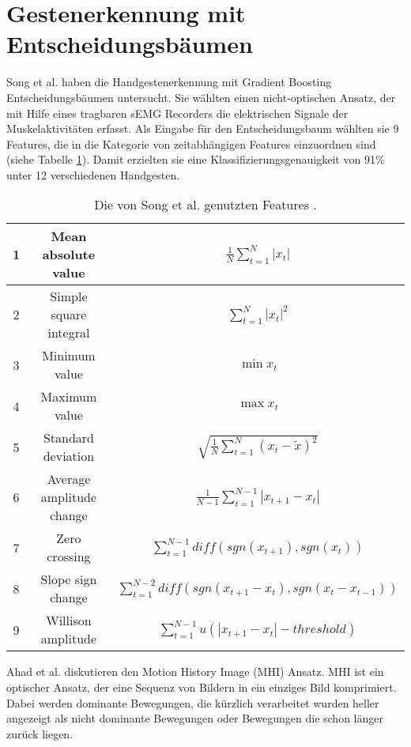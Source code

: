 \section{Gestenerkennung mit Entscheidungsbäumen}
\label{sec:sota_misc}
Song et al. \cite{song2019design} haben die Handgestenerkennung mit Gradient Boosting Entscheidungsbäumen untersucht. Sie wählten einen nicht-optischen Ansatz, der mit Hilfe eines tragbaren sEMG Recorders
die elektrischen Signale der Muskelaktivitäten erfasst. Als Eingabe für den Entscheidungsbaum wählten sie 9 Features, die in die Kategorie von zeitabhängigen Features einzuordnen sind
(siehe Tabelle \ref{tab:songFeatures}). Damit erzielten sie eine Klassifizierungsgenauigkeit von 91\% unter 12 verschiedenen Handgesten.
\begin{table}[h!]
    \centering
    \begin{tabular}{ c | c | c }
        \hline
        \hline
        1 & Mean absolute value & $\frac{1}{N}\sum^N_{t=1} |x_t|$ \\\hline
        2 & Simple square integral & $\sum^N_{t=1} |x_t|^2$ \\\hline
        3 & Minimum value & $\min x_t$ \\\hline
        4 & Maximum value & $\max x_t$ \\\hline
        5 & Standard deviation & $\sqrt{\frac{1}{N}\sum^N_{t=1}(x_t - \tilde{x})^2}$ \\\hline
        6 & Average amplitude change & $\frac{1}{N-1}\sum^{N-1}_{t=1} |x_{t + 1} - x_t|$ \\\hline
        7 & Zero crossing & $\sum^{N-1}_{t=1}diff(sgn(x_{t+1}),sgn(x_t))$ \\\hline
        8 & Slope sign change & $\sum^{N-2}_{t=1}diff(sgn(x_{t+1} - x_t),sgn(x_t - x_{t - 1}))$ \\\hline
        9 & Willison amplitude & $\sum^{N-1}_{t=1}u(|x_{t+1} - x_t| - threshold)$ \\
        \hline
        \hline
    \end{tabular}
    \caption{Die von Song et al. genutzten Features \cite{song2019design}.}
    \label{tab:songFeatures}
\end{table}
\newline
\newline
Ahad et al. \cite{ahad2012motion} diskutieren den Motion History Image (MHI) Ansatz. MHI ist ein optischer Ansatz, der eine Sequenz von Bildern in ein einziges Bild komprimiert. Dabei werden dominante Bewegungen, die
kürzlich verarbeitet wurden heller angezeigt als nicht dominante Bewegungen oder Bewegungen die schon länger zurück liegen.
